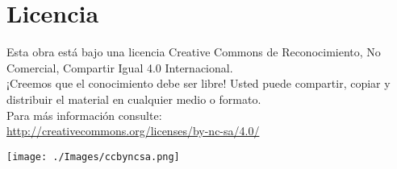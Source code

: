 \thispagestyle{empty}

\chapter{Licencia}
Esta obra está bajo una licencia Creative Commons de Reconocimiento, No Comercial, Compartir Igual 4.0 Internacional. \\

¡Creemos que el conocimiento debe ser libre! Usted puede compartir, copiar y distribuir el material en cualquier medio o formato. \\

Para más información consulte: \\ \url{http://creativecommons.org/licenses/by-nc-sa/4.0/}

\texttt{[image: ./Images/ccbyncsa.png]}
